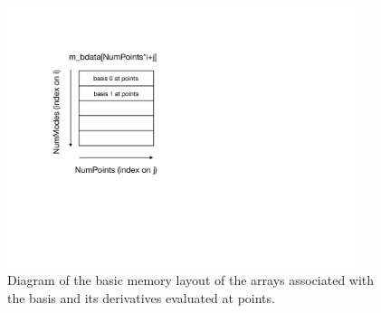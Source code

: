\begin{figure}[htb]
\centering
\includegraphics[width=4in]{img/basismemory.pdf}
\caption{Diagram of the basic memory layout of the arrays associated with the basis and its derivatives evaluated at points.}
\label{foundations:basismemory}
\end{figure}
